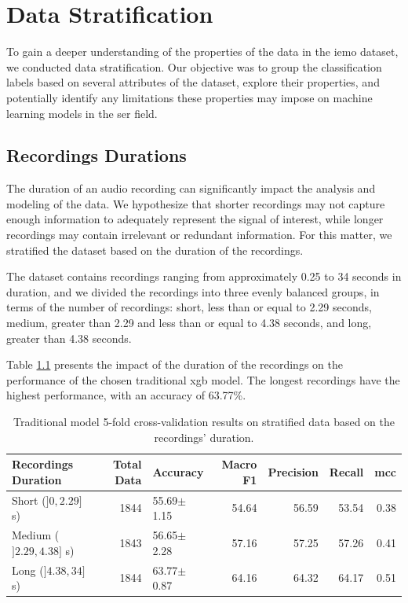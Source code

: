 \chapter{Data Stratification}
\label{chapter:data_stratification}

To gain a deeper understanding of the properties of the data in the \ac{iemo} dataset, we conducted data stratification. Our objective was to group the classification labels based on several attributes of the dataset, explore their properties, and potentially identify any limitations these properties may impose on machine learning models in the \ac{ser} field.

\section{Recordings Durations}

The duration of an audio recording can significantly impact the analysis and modeling of the data. We hypothesize that shorter recordings may not capture enough information to adequately represent the signal of interest, while longer recordings may contain irrelevant or redundant information. For this matter, we stratified the dataset based on the duration of the recordings.

The dataset contains recordings ranging from approximately 0.25 to 34 seconds in duration, and we divided the recordings into three evenly balanced groups, in terms of the number of recordings: short, less than or equal to  2.29 seconds, medium, greater than 2.29 and less than or equal to 4.38 seconds, and long, greater than 4.38 seconds.

Table \ref{5:durations} presents the impact of the duration of the recordings on the performance of the chosen traditional \ac{xgb} model. The longest recordings have the highest performance, with an accuracy of 63.77\%.

\begin{table}[H]
	\centering
	\caption{Traditional model 5-fold cross-validation results on stratified data based on the recordings' duration.}
	\label{5:durations}
	\begin{tabular}{lrlrrrr}
		\toprule
		Recordings Duration &   Total Data & Accuracy    &   Macro F1 &   Precision &   Recall &   \ac{mcc} \\
		\midrule
		Short ($]0, 2.29]$ s)	 	&      1844 & 55.69$\pm$1.15 &   54.64 &  56.59 &  53.54 &  0.38  \\
		Medium ($]2.29, 4.38]$ s) 	&      1843 & 56.65$\pm$2.28 &   57.16 &  57.25 &  57.26 &  0.41 \\
		Long ($]4.38, 34]$ s) 		&      1844 & 63.77$\pm$0.87 &   64.16 &  64.32 &  64.17 &  0.51  \\	
		\bottomrule
	\end{tabular}
\end{table}

